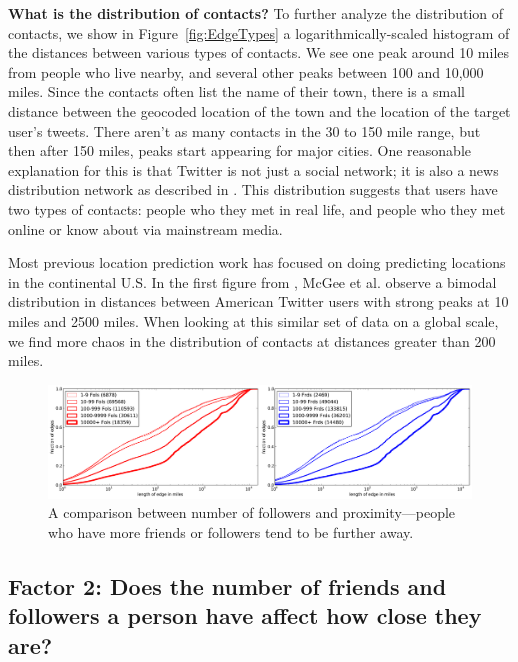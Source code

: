 \documentclass[letterpaper]{article}
\begin{document}
\noindent\textbf{What is the distribution of contacts?}
To further analyze the distribution of contacts, we show in
Figure~\ref{fig:EdgeTypes} a logarithmically-scaled
histogram of the distances between various types of contacts.
%
We see one peak around 10 miles from people who live nearby, and several
other peaks between 100 and 10,000 miles.
%
Since the contacts often list the name of their town, there is a small distance
between the geocoded location of the town and the location of the target
user's tweets.
%
There aren't as many contacts in the 30 to 150 mile range, but then after 150
miles, peaks start appearing for major cities.
%
One reasonable explanation for this is that Twitter is not just a social
network; it is also a news distribution network as described in
\cite{kwak2010why}.
%
This distribution suggests that users have two types of contacts: people who
they met in real life, and people who they met online or know about via
mainstream media.

Most previous location prediction work has focused on doing predicting
locations in the continental U.S.
%
In the first figure from \cite{mcgee2011geographic}, McGee et al. observe a
bimodal distribution in distances between American Twitter users with strong
peaks at 10 miles and 2500 miles.
%
When looking at this similar set of data on a global scale, we find more chaos
in the distribution of contacts at distances greater than 200 miles.

\begin{figure}[tb]
\centering
\includegraphics[width=\linewidth]{figures/edge_counts.pdf}
\caption{
A comparison between number of followers and proximity---people who have more
friends or followers tend to be further away.
}
\label{fig:EdgeCounts}
\vspace{-2pt}
\end{figure}

\subsection{Factor 2: Does the number of friends and followers a person have affect how
close they are?}
\end{document}
